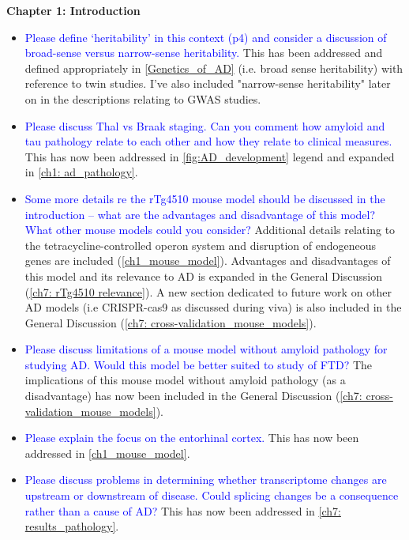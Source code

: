 \documentclass[a4paper,12pt,oneside]{report}
\begin{document}
\textbf{Chapter 1: Introduction}
\begin{itemize}
	\item \textcolor{blue}{Please define ‘heritability’ in this context (p4) and consider a discussion of broad-sense versus narrow-sense heritability.} 
	This has been addressed and defined appropriately in \cref{Genetics_of_AD} (i.e. broad sense heritability) with reference to twin studies. I've also included "narrow-sense heritability" later on in the descriptions relating to GWAS studies.	
	\item \textcolor{blue}{Please discuss Thal vs Braak staging. Can you comment how amyloid and tau pathology relate to each other and how they relate to clinical measures.}
	This has now been addressed in \cref{fig:AD_development} legend and expanded in \cref{ch1: ad_pathology}.
	\item \textcolor{blue}{Some more details re the rTg4510 mouse model should be discussed in the introduction – what are the advantages and disadvantage of this model? What other mouse models could you consider?} 
	\newline Additional details relating to the tetracycline-controlled operon system and disruption of endogeneous genes are included (\cref{ch1_mouse_model}).
	\newline Advantages and disadvantages of this model and its relevance to AD is expanded in the General Discussion (\cref{ch7: rTg4510 relevance}). A new section dedicated to future work on other AD models (i.e CRISPR-cas9 as discussed during viva) is also included in the General Discussion (\cref{ch7: cross-validation_mouse_models}).  
	\item \textcolor{blue}{Please discuss limitations of a mouse model without amyloid pathology for studying AD. Would this model be better suited to study of FTD?} 
	\newline The implications of this mouse model without amyloid pathology (as a disadvantage) has now been included in the General Discussion (\cref{ch7: cross-validation_mouse_models}).
	\item \textcolor{blue}{Please explain the focus on the entorhinal cortex.} 
	\newline This has now been addressed in \cref{ch1_mouse_model}.
	\item \textcolor{blue}{Please discuss problems in determining whether transcriptome changes are upstream or downstream of disease. Could splicing changes be a consequence rather than a cause of AD?}
	\newline This has now been addressed in \cref{ch7: results_pathology}.
\end{itemize}
\end{document}
